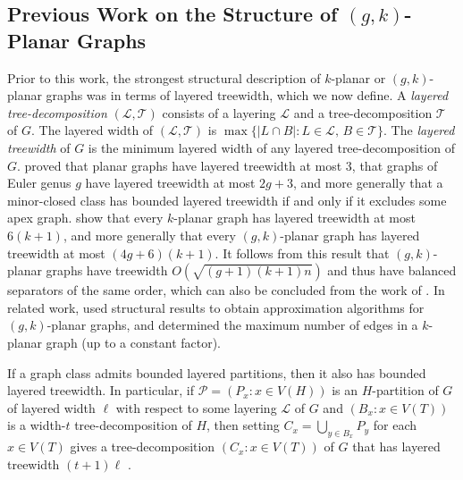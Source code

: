 \documentclass{patmorin}
\newcommand{\notex}[2]{}
\begin{document}
\subsection{Previous Work on the Structure of $(g,k)$-Planar Graphs}
\label{PriorWork}


Prior to this work, the strongest structural description of $k$-planar or $(g,k)$-planar graphs was in terms of layered treewidth, which we now define.  A \emph{layered tree-decomposition} $(\mathcal{L},\mathcal{T})$ consists of a layering $\mathcal{L}$ and a tree-decomposition $\mathcal{T}$ of $G$. The layered width of $(\mathcal{L},\mathcal{T})$ is $\max\{|L\cap B|: L\in \mathcal{L},\, B\in \mathcal{T}\}$.  The \emph{layered treewidth} of $G$ is the minimum layered width of any layered tree-decomposition of $G$. \citet{dujmovic.morin.ea:layered} proved that planar graphs have layered treewidth at most 3, that graphs of Euler genus $g$ have layered treewidth at most $2g+3$, and more generally that a minor-closed class has bounded layered treewidth if and only if it excludes some apex graph. \citet{dujmovic.eppstein.ea:structure} show that every $k$-planar graph has layered treewidth at most $6(k+1)$, and more generally that every $(g,k)$-planar graph has layered treewidth at most $(4g+6)(k+1)$. It follows from this result that $(g,k)$-planar graphs have treewidth $O(\sqrt{(g+1)(k+1)n})$ and thus have balanced separators of the same order, which can also be concluded from the work of 
\citet{FP08}. In related work, \citet{grigoriev.bodlaender:algorithms} used structural results to obtain approximation algorithms for $(g,k)$-planar graphs, and \citet{PachToth97} determined the maximum number of edges in a $k$-planar graph (up to a constant factor). 

If a graph class admits bounded layered partitions, then it also has bounded layered treewidth. In particular, if $\mathcal{P}=(P_x:x\in V(H))$ is an $H$-partition of $G$ of layered width $\ell$ with respect to some layering $\mathcal{L}$ of $G$ and $(B_x:x\in V(T))$ is a width-$t$ tree-decomposition of $H$, then setting $C_x = \bigcup_{y\in B_x} P_y$ for each $x\in V(T)$ gives a tree-decomposition $(C_x:x\in V(T))$ of $G$ that has layered treewidth $(t+1)\ell$ \cite{dujmovic.joret.ea:planar}.  
\end{document}
